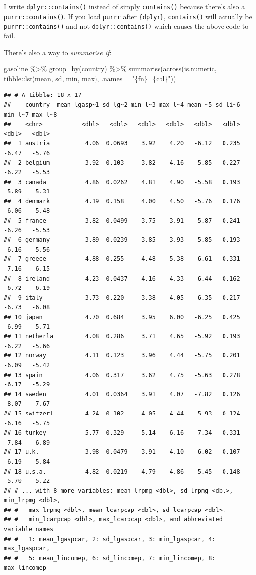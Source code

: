 \documentclass[
]{article}
\newenvironment{Shaded}{\begin{snugshade}}{\end{snugshade}}
\newcommand{\AttributeTok}[1]{\textcolor[rgb]{0.77,0.63,0.00}{#1}}
\newcommand{\FunctionTok}[1]{\textcolor[rgb]{0.00,0.00,0.00}{#1}}
\newcommand{\NormalTok}[1]{#1}
\newcommand{\SpecialCharTok}[1]{\textcolor[rgb]{0.00,0.00,0.00}{#1}}
\newcommand{\StringTok}[1]{\textcolor[rgb]{0.31,0.60,0.02}{#1}}
\begin{document}
I write \texttt{dplyr::contains()} instead of simply \texttt{contains()} because there's also a
\texttt{purrr::contains()}. If you load \texttt{purrr} after \texttt{\{dplyr\}}, \texttt{contains()} will actually be
\texttt{purrr::contains()} and not \texttt{dplyr::contains()} which causes the above code to fail.

There's also a way to \emph{summarise if}:

\begin{Shaded}
\begin{Highlighting}[]
\NormalTok{gasoline }\SpecialCharTok{\%\textgreater{}\%}
  \FunctionTok{group\_by}\NormalTok{(country) }\SpecialCharTok{\%\textgreater{}\%}
  \FunctionTok{summarise}\NormalTok{(}\FunctionTok{across}\NormalTok{(is.numeric, tibble}\SpecialCharTok{::}\FunctionTok{lst}\NormalTok{(mean, sd, min, max), }\AttributeTok{.names =} \StringTok{"\{fn\}\_\{col\}"}\NormalTok{))}
\end{Highlighting}
\end{Shaded}

\begin{verbatim}
## # A tibble: 18 x 17
##    country  mean_lgasp~1 sd_lg~2 min_l~3 max_l~4 mean_~5 sd_li~6 min_l~7 max_l~8
##    <chr>           <dbl>   <dbl>   <dbl>   <dbl>   <dbl>   <dbl>   <dbl>   <dbl>
##  1 austria          4.06  0.0693    3.92    4.20   -6.12   0.235   -6.47   -5.76
##  2 belgium          3.92  0.103     3.82    4.16   -5.85   0.227   -6.22   -5.53
##  3 canada           4.86  0.0262    4.81    4.90   -5.58   0.193   -5.89   -5.31
##  4 denmark          4.19  0.158     4.00    4.50   -5.76   0.176   -6.06   -5.48
##  5 france           3.82  0.0499    3.75    3.91   -5.87   0.241   -6.26   -5.53
##  6 germany          3.89  0.0239    3.85    3.93   -5.85   0.193   -6.16   -5.56
##  7 greece           4.88  0.255     4.48    5.38   -6.61   0.331   -7.16   -6.15
##  8 ireland          4.23  0.0437    4.16    4.33   -6.44   0.162   -6.72   -6.19
##  9 italy            3.73  0.220     3.38    4.05   -6.35   0.217   -6.73   -6.08
## 10 japan            4.70  0.684     3.95    6.00   -6.25   0.425   -6.99   -5.71
## 11 netherla         4.08  0.286     3.71    4.65   -5.92   0.193   -6.22   -5.66
## 12 norway           4.11  0.123     3.96    4.44   -5.75   0.201   -6.09   -5.42
## 13 spain            4.06  0.317     3.62    4.75   -5.63   0.278   -6.17   -5.29
## 14 sweden           4.01  0.0364    3.91    4.07   -7.82   0.126   -8.07   -7.67
## 15 switzerl         4.24  0.102     4.05    4.44   -5.93   0.124   -6.16   -5.75
## 16 turkey           5.77  0.329     5.14    6.16   -7.34   0.331   -7.84   -6.89
## 17 u.k.             3.98  0.0479    3.91    4.10   -6.02   0.107   -6.19   -5.84
## 18 u.s.a.           4.82  0.0219    4.79    4.86   -5.45   0.148   -5.70   -5.22
## # ... with 8 more variables: mean_lrpmg <dbl>, sd_lrpmg <dbl>, min_lrpmg <dbl>,
## #   max_lrpmg <dbl>, mean_lcarpcap <dbl>, sd_lcarpcap <dbl>,
## #   min_lcarpcap <dbl>, max_lcarpcap <dbl>, and abbreviated variable names
## #   1: mean_lgaspcar, 2: sd_lgaspcar, 3: min_lgaspcar, 4: max_lgaspcar,
## #   5: mean_lincomep, 6: sd_lincomep, 7: min_lincomep, 8: max_lincomep
\end{verbatim}
\end{document}
